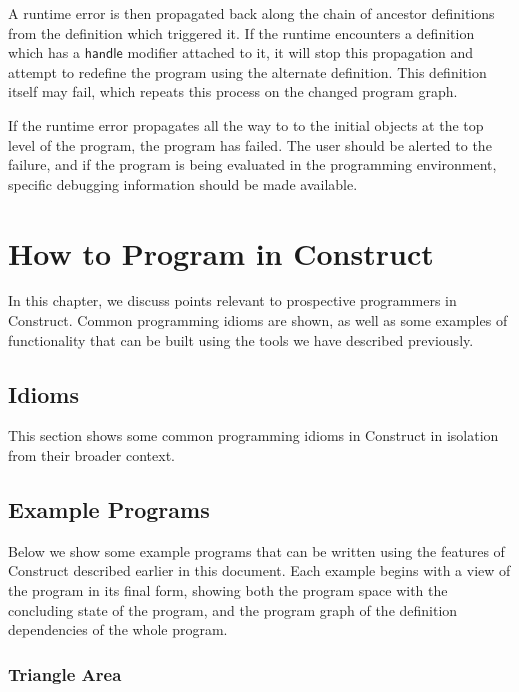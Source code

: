 \documentclass[twoside,11pt]{report}
\begin{document}
A runtime error is then propagated back along the chain of ancestor definitions from the definition which triggered it. 
If the runtime encounters a definition which has a $\mathsf{handle}$ modifier attached to it, it will stop this propagation and attempt to redefine the program using the alternate definition.
This definition itself may fail, which repeats this process on the changed program graph.

If the runtime error propagates all the way to to the initial objects at the top level of the program, the program has failed. 
The user should be alerted to the failure, and if the program is being evaluated in the programming environment, specific debugging information should be made available.

\chapter{How to Program in Construct}
\label{chap:howto}

In this chapter, we discuss points relevant to prospective programmers in Construct. Common programming idioms are shown, as well as some examples of functionality that can be built using the tools we have described previously.

\section{Idioms}
\label{sec:idioms}

This section shows some common programming idioms in Construct in isolation from their broader context.

\section{Example Programs}
\label{sec:example}

Below we show some example programs that can be written using the features of Construct described earlier in this document. 
Each example begins with a view of the program in its final form, showing both the program space with the concluding state of the program, and the program graph of the definition dependencies of the whole program.

\pagebreak

\subsection{Triangle Area}
\label{subsec:triarea}
\end{document}
